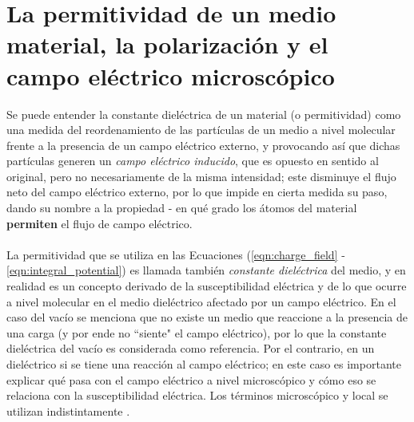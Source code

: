\documentclass[12pt, oneside, numbers, spanish]{ezthesis}
\numberwithin{equation}{section}
\begin{document}
\section{La permitividad de un medio material, la polarización y el campo eléctrico microscópico}\label{Sec:perm_polarization_mic_E_field}
Se puede entender la constante dieléctrica de un material (o permitividad) como una medida del reordenamiento de las partículas de un medio a nivel molecular frente a la presencia de un campo eléctrico externo, y provocando así que dichas partículas generen un \textit{campo eléctrico inducido}, que es opuesto en sentido al original, pero no necesariamente de la misma intensidad; este disminuye el flujo neto del campo eléctrico externo, por lo que impide en cierta medida su paso, dando su nombre a la propiedad - en qué grado los átomos del material \textbf{permiten} el flujo de campo eléctrico.\\\\
La permitividad que se utiliza en las Ecuaciones (\ref{eqn:charge_field} - \ref{eqn:integral_potential}) es llamada también \textit{constante dieléctrica} del medio, y en realidad es un concepto derivado de la susceptibilidad eléctrica y de lo que ocurre a nivel molecular en el medio dieléctrico afectado por un campo eléctrico. En el caso del vacío se menciona que no existe un medio que reaccione a la presencia de una carga (y por ende no ``siente" el campo eléctrico), por lo que la constante dieléctrica del vacío es considerada como referencia. Por el contrario, en un dieléctrico si se tiene una reacción al campo eléctrico; en este caso es importante explicar qué pasa con el campo eléctrico a nivel microscópico y cómo eso se relaciona con la susceptibilidad eléctrica. Los términos microscópico y local se utilizan indistintamente \cite{Kantorovich}.
\end{document}
